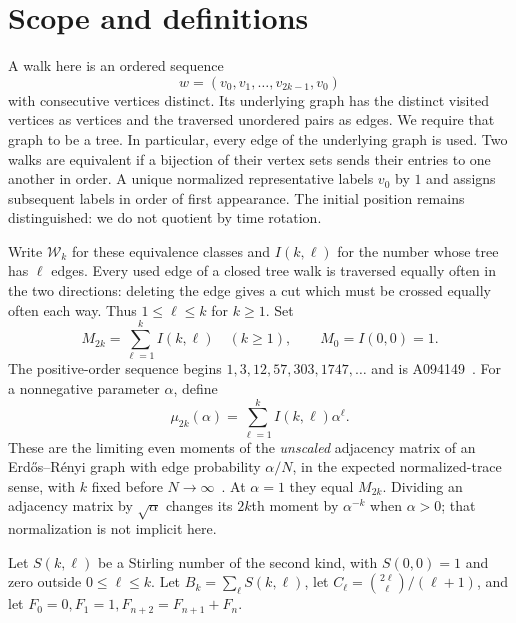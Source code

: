 \documentclass[11pt,letterpaper]{article}
\theoremstyle{remark}\newtheorem{remark}[theorem]{Remark}
\newcommand{\Wc}{\mathcal W}\newcommand{\Uc}{\mathcal U}\newcommand{\Part}{\operatorname{Part}}
\theoremstyle{definition}\newtheorem{definition}[theorem]{Definition}
\begin{document}

\section{Scope and definitions}
A walk here is an ordered sequence
\[
 w=(v_0,v_1,\ldots,v_{2k-1},v_0)
\]
with consecutive vertices distinct. Its underlying graph has the distinct visited vertices as vertices and the traversed unordered pairs as edges. We require that graph to be a tree. In particular, every edge of the underlying graph is used. Two walks are equivalent if a bijection of their vertex sets sends their entries to one another in order. A unique normalized representative labels $v_0$ by $1$ and assigns subsequent labels in order of first appearance. The initial position remains distinguished: we do not quotient by time rotation.

Write $\Wc_k$ for these equivalence classes and $I(k,\ell)$ for the number whose tree has $\ell$ edges. Every used edge of a closed tree walk is traversed equally often in the two directions: deleting the edge gives a cut which must be crossed equally often each way. Thus $1\le\ell\le k$ for $k\ge1$. Set
\[
 M_{2k}=\sum_{\ell=1}^{k}I(k,\ell)\quad(k\ge1),\qquad M_0=I(0,0)=1.
\]
The positive-order sequence begins $1,3,12,57,303,1747,\ldots$ and is A094149~\cite{oeis}. For a nonnegative parameter $\alpha$, define
\begin{equation}\label{sgm:sb:eq:momentpoly}
 \mu_{2k}(\alpha)=\sum_{\ell=1}^k I(k,\ell)\alpha^\ell.
\end{equation}
These are the limiting even moments of the \emph{unscaled} adjacency matrix of an Erd\H{o}s--R\'enyi graph with edge probability $\alpha/N$, in the expected normalized-trace sense, with $k$ fixed before $N\to\infty$~\cite[\S5.3]{bg}. At $\alpha=1$ they equal $M_{2k}$. Dividing an adjacency matrix by $\sqrt\alpha$ changes its $2k$th moment by $\alpha^{-k}$ when $\alpha>0$; that normalization is not implicit here.

Let $S(k,\ell)$ be a Stirling number of the second kind, with $S(0,0)=1$ and zero outside $0\le\ell\le k$. Let $B_k=\sum_\ell S(k,\ell)$, let $C_\ell=\binom{2\ell}{\ell}/(\ell+1)$, and let $F_0=0,F_1=1,F_{n+2}=F_{n+1}+F_n$.
\end{document}
